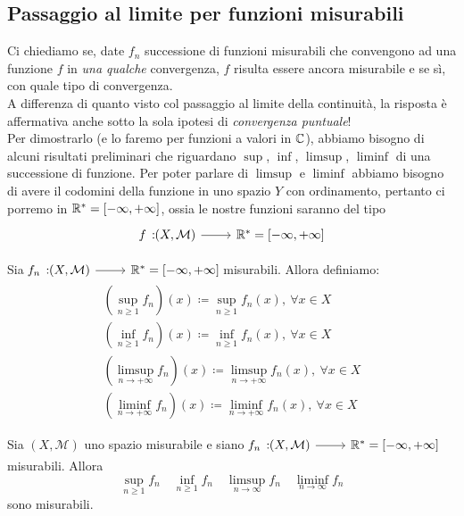 \subsection{Passaggio al limite per funzioni misurabili}
Ci chiediamo se, date $f_n$ successione di funzioni misurabili che convengono ad una funzione $f$ in \textit{una qualche} convergenza, $f$ risulta essere ancora misurabile e se sì, con quale tipo di convergenza.\\
A differenza di quanto visto col passaggio al limite della continuità, la risposta è affermativa anche sotto la sola ipotesi di \textit{convergenza puntuale}!\\
Per dimostrarlo (e lo faremo per funzioni a valori in $\mathbb{C}$), abbiamo bisogno di alcuni risultati preliminari che riguardano $\sup$, $\inf$, $\limsup$, $\liminf$ di una successione di funzione. Per poter parlare di $\limsup$ e $\liminf$ abbiamo bisogno di avere il codomini della funzione in uno spazio $Y$ con ordinamento, pertanto ci porremo in  $\mathbb{R}^{\ast}=\left[-\infty,+\infty\right]$, ossia le nostre funzioni saranno del tipo
\begin{equation*}
\funz{f}{\left(X,\mathcal{M}\right)}{\realset^{\ast}=\left[-\infty,+\infty\right]}
\end{equation*}
\begin{defines}
Sia $\funz{f_n}{\left(X,\mathcal{M}\right)}{\realset^{\ast}=\left[-\infty,+\infty\right]}$ misurabili.
Allora definiamo:
\begin{gather*}
	\left(\sup_{n\geq 1} f_n\right)(x)\coloneqq \sup_{n\geq 1}f_n(x),\ \forall x\in X\\
	\left(\inf_{n\geq 1} f_n\right)(x)\coloneqq \inf_{n\geq 1}f_n(x),\ \forall x\in X\\
	\left(\limsup_{n\to+\infty} f_n\right)(x)\coloneqq \limsup_{n\to+\infty}f_n(x),\ \forall x\in X\\
	\left(\liminf_{n\to+\infty} f_n\right)(x)\coloneqq \liminf_{n\to+\infty}f_n(x),\ \forall x\in X
\end{gather*}
\end{defines}
\begin{proposition}\label{misurabilitàsupinf}
	Sia $ \left(X,\mathcal{M}\right)$ uno spazio misurabile e siano $\funz{f_n}{\left(X,\mathcal{M}\right)}{\realset^{\ast}=\left[-\infty,+\infty\right]}$ misurabili.
	Allora
	\begin{equation*}
		\sup_{n\geq 1} f_n\quad\inf_{n\geq 1} f_n\quad\limsup_{n\to\infty} f_n\quad\liminf_{n\to\infty} f_n
	\end{equation*}
sono misurabili.
\end{proposition}
